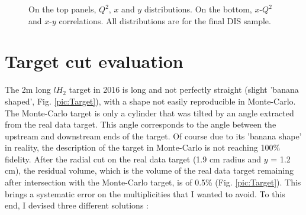 \begin{figure}[!h]
	\caption{On the top panels, $Q^2$, $x$ and $y$ distributions. On the bottom, $x$-$Q^2$ and $x$-$y$ correlations. All distributions are for the final DIS sample.}
	\label{pic:DISdist}
\end{figure}


\section{Target cut evaluation} \label{sec:targetcut}

The 2m long $lH_2$ target in 2016 is long and not perfectly straight (slight 'banana shaped', Fig. \ref{pic:Target}), with a shape not easily reproducible in Monte-Carlo. The Monte-Carlo target is only a cylinder that was tilted by an angle extracted from the real data target. This angle corresponds to the angle between the upstream and downstream ends of the target. Of course due to its 'banana shape' in reality, the description of the target in Monte-Carlo is not reaching 100\% fidelity. After the radial cut on the real data target (1.9 cm radius and $y$ = 1.2 cm), the residual volume, which is the volume of the real data target remaining after intersection with the Monte-Carlo target, is of 0.5\% (Fig. \ref{pic:Target}). This brings a systematic error on the multiplicities that I wanted to avoid. To this end, I devised three different solutions :

